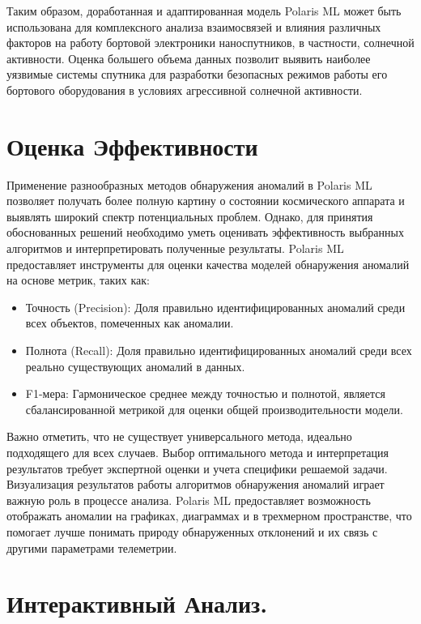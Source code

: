 \documentclass[14pt, a4paper]{../cls/coursework}
\begin{document}
    Таким образом, доработанная и адаптированная модель Polaris ML может быть использована для комплексного анализа взаимосвязей и влияния различных факторов на работу бортовой электроники наноспутников, в частности, солнечной активности.
    Оценка большего объема данных позволит выявить наиболее уязвимые системы спутника для разработки безопасных режимов работы его бортового оборудования в условиях агрессивной солнечной активности.

    \section{Оценка Эффективности}
    Применение разнообразных методов обнаружения аномалий в Polaris ML позволяет получать более полную картину о состоянии космического аппарата и выявлять широкий спектр потенциальных проблем. Однако, для принятия обоснованных решений необходимо уметь оценивать эффективность выбранных алгоритмов и интерпретировать полученные результаты.
    Polaris ML предоставляет инструменты для оценки качества моделей обнаружения аномалий на основе метрик, таких как:

    \begin{itemize}
        \item Точность (Precision): Доля правильно идентифицированных аномалий среди всех объектов, помеченных как аномалии.
        \item Полнота (Recall): Доля правильно идентифицированных аномалий среди всех реально существующих аномалий в данных.
        \item F1-мера: Гармоническое среднее между точностью и полнотой, является сбалансированной метрикой для оценки общей производительности модели.
    \end{itemize}

    Важно отметить, что не существует универсального метода, идеально подходящего для всех случаев.
    Выбор оптимального метода и интерпретация результатов требует экспертной оценки и учета специфики решаемой задачи.
    Визуализация результатов работы алгоритмов обнаружения аномалий играет важную роль в процессе анализа.
    Polaris ML предоставляет возможность отображать аномалии на графиках, диаграммах и в трехмерном пространстве, что помогает лучше понимать природу обнаруженных отклонений и их связь с другими параметрами телеметрии.

    \section{Интерактивный Анализ.}
\end{document}
